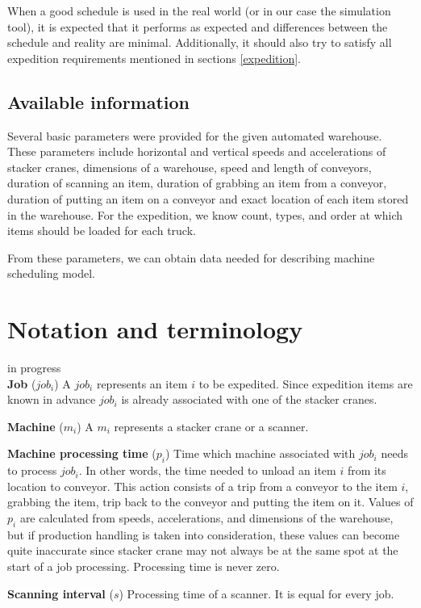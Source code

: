 \documentclass{ctuthesis}
\begin{document}
When a good schedule is used in the real world (or in our case the simulation tool), it is expected that it performs as expected and differences between the schedule and reality are minimal. Additionally, it should also try to satisfy all expedition requirements mentioned in sections \ref{expedition}.

\subsection{Available information}

Several basic parameters were provided for the given automated warehouse. These parameters include horizontal and vertical speeds and accelerations of stacker cranes, dimensions of a warehouse, speed and length of conveyors, duration of scanning an item, duration of grabbing an item from a conveyor, duration of putting an item on a conveyor and exact location of each item stored in the warehouse. For the expedition, we know count, types, and order at which items should be loaded for each truck. 

From these parameters, we can obtain data needed for describing machine scheduling model.


\section{Notation and terminology}
in progress\\
\noindent \textbf{Job} ($job_i$) A $job_i$ represents an item $i$ to be expedited. Since expedition items are known in advance $job_i$ is already associated with one of the stacker cranes. 

\noindent \textbf{Machine} ($m_i$) A $m_i$ represents a stacker crane or a scanner. 

\noindent \textbf{Machine processing time} ($p_i$) Time which machine associated with $job_i$ needs to process $job_i$. In other words, the time needed to unload an item $i$ from its location to conveyor. This action consists of a trip from a conveyor to the item $i$, grabbing the item, trip back to the conveyor and putting the item on it. Values of $p_i$ are calculated from speeds, accelerations, and dimensions of the warehouse, but if production handling is taken into consideration, these values can become quite inaccurate since stacker crane may not always be at the same spot at the start of a job processing. Processing time is never zero.


\noindent \textbf{Scanning interval} ($s$) Processing time of a scanner. It is equal for every job.
\end{document}
